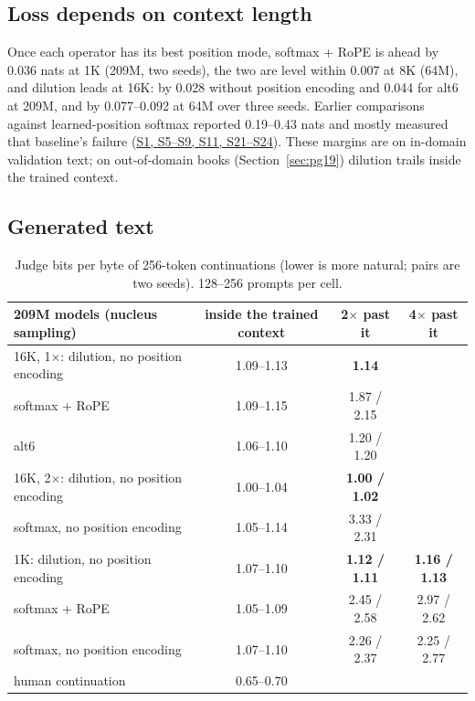 \documentclass[11pt]{article}
\newcommand{\ledger}[1]{\href{https://github.com/Royer-Research-Labs/Dilution-Attention/blob/main/docs/signals.md}{#1}}
\begin{document}
\subsection{Loss depends on context length}

Once each operator has its best position mode, softmax + RoPE is ahead by 0.036 nats at 1K (209M,
two seeds), the two are level within 0.007 at 8K (64M), and dilution leads at 16K: by 0.028 without
position encoding and 0.044 for alt6 at 209M, and by 0.077--0.092 at 64M over three seeds. Earlier
comparisons against learned-position softmax reported 0.19--0.43 nats and mostly measured that
baseline's failure (\ledger{S1, S5--S9, S11, S21--S24}). These margins are on in-domain
validation text; on out-of-domain books (Section~\ref{sec:pg19}) dilution trails inside the trained
context.

\subsection{Generated text}

\begin{table}[t]
\centering\small
\begin{tabular}{@{}lccc@{}}
\toprule
209M models (nucleus sampling) & inside the trained context & 2$\times$ past it & 4$\times$ past it \\
\midrule
16K, 1$\times$: dilution, no position encoding & 1.09--1.13 & \textbf{1.14} & \\
\quad softmax + RoPE & 1.09--1.15 & 1.87 / 2.15 & \\
\quad alt6 & 1.06--1.10 & 1.20 / 1.20 & \\
16K, 2$\times$: dilution, no position encoding & 1.00--1.04 & \textbf{1.00 / 1.02} & \\
\quad softmax, no position encoding & 1.05--1.14 & 3.33 / 2.31 & \\
1K: dilution, no position encoding & 1.07--1.10 & \textbf{1.12 / 1.11} & \textbf{1.16 / 1.13} \\
\quad softmax + RoPE & 1.05--1.09 & 2.45 / 2.58 & 2.97 / 2.62 \\
\quad softmax, no position encoding & 1.07--1.10 & 2.26 / 2.37 & 2.25 / 2.77 \\
human continuation & 0.65--0.70 & & \\
\bottomrule
\end{tabular}
\caption{Judge bits per byte of 256-token continuations (lower is more natural; pairs are two seeds).
128--256 prompts per cell.}
\label{tab:gen}
\end{table}
\end{document}
